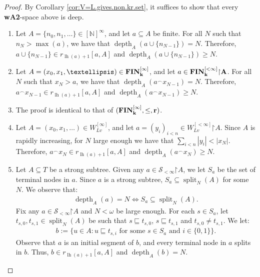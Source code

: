 \documentclass[10pt,a4paper]{amsart}
\newcommand{\FIN}{\bf{FIN}}
\newcommand{\N}{\mathbb{N}}
\renewcommand{\S}{\mathcal{S}}
\newcommand{\depth}{\func{depth}}
\newcommand{\func}{\operatorname}
\newcommand{\lh}{\func{lh}}
\newcommand{\restrictedto}{\mathord{\upharpoonright}}
\begin{document}
\begin{proof}
    By Corollary \ref{cor:V=L.gives.non.kr.set}, it suffices to show that every \textbf{wA2}-space above is deep.
    \begin{enumerate}
        \item Let $A = \{n_0,n_1,\dots\} \in [\N]^\infty$, and let $a \subseteq A$ be finite. For all $N$ such that $n_N > \max(a)$, we have that $\depth_A(a \cup \{n_{N-1}\}) = N$. Therefore, $a \cup \{n_{N-1}\} \in r_{\lh(a)+1}[a,A]$ and $\depth_A(a \cup \{n_{N-1}\}) \geq N$.
        
        \item Let $A = (x_0,x_1,\dots) \in \FIN_k^{[\infty]}$, and let $a \in \FIN_k^{[<\infty]}\restrictedto A$. For all $N$ such that $x_N > a$, we have that $\depth_A(a^\frown x_{N-1}) = N$. Therefore, $a^\frown x_{N-1} \in r_{\lh(a)+1}[a,A]$ and $\depth_A(a^\frown x_{N-1}) \geq N$.
        
        \item The proof is identical to that of $(\FIN_k^{[\infty]},\leq,r)$.
        
        \item Let $A = (x_0,x_1,\dots) \in W_{Lv}^{[\infty]}$, and let $a = (y_i)_{i<n} \in W_{Lv}^{[<\infty]}\restrictedto A$. Since $A$ is rapidly increasing, for $N$ large enough we have that $\sum_{i<n} |y_i| < |x_N|$. Therefore, $a^\frown x_N \in r_{\lh(a)+1}[a,A]$ and $\depth_A(a^\frown x_N) \geq N$.
        
        \item Let $A \subseteq T$ be a strong subtree. Given any $a \in \S_{<\infty}\restrictedto A$, we let $S_a$ be the set of terminal nodes in $a$. Since $a$ is a strong subtree, $S_a \subseteq \func{split}_N(A)$ for some $N$. We observe that:
        \begin{align*}
            \depth_A(a) = N \iff S_a \subseteq \func{split}_N(A).
        \end{align*}
        Fix any $a \in \S_{<\infty}\restrictedto A$ and $N < \omega$ be large enough. For each $s \in S_a$, let $t_{s,0},t_{s,1} \in \func{split}_N(A)$ be such that $s \sqsubseteq t_{s,0}$, $s \sqsubseteq t_{s,1}$ and $t_{s,0} \neq t_{s,1}$. We let:
        \begin{align*}
            b := \{u \in A : u \sqsubseteq t_{s,i} \text{ for some $s \in S_a$ and $i \in \{0,1\}$}\}.
        \end{align*}
        Observe that $a$ is an initial segment of $b$, and every terminal node in $a$ splits in $b$. Thus, $b \in r_{\lh(a)+1}[a,A]$ and $\depth_A(b) = N$.


\end{enumerate}
\end{proof}
\end{document}
